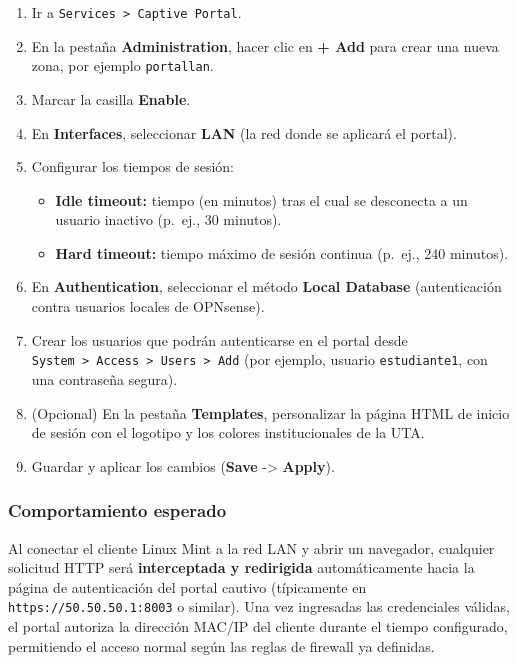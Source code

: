 \documentclass{article}
\providecommand{\tightlist}{%
  \setlength{\itemsep}{0pt}\setlength{\parskip}{0pt}}
\renewcommand{\_}{\oldunderscore\hskip0pt\relax}
\begin{document}
\begin{enumerate}
\def\labelenumi{\arabic{enumi}.}
\tightlist
\item
  Ir a \texttt{Services\ \textgreater{}\ Captive\ Portal}.
\item
  En la pestaña \textbf{Administration}, hacer clic en \textbf{+ Add}
  para crear una nueva zona, por ejemplo \texttt{portal\_lan}.
\item
  Marcar la casilla \textbf{Enable}.
\item
  En \textbf{Interfaces}, seleccionar \textbf{LAN} (la red donde se
  aplicará el portal).
\item
  Configurar los tiempos de sesión:

  \begin{itemize}
  \tightlist
  \item
    \textbf{Idle timeout:} tiempo (en minutos) tras el cual se
    desconecta a un usuario inactivo (p.~ej., 30 minutos).
  \item
    \textbf{Hard timeout:} tiempo máximo de sesión continua (p.~ej., 240
    minutos).
  \end{itemize}
\item
  En \textbf{Authentication}, seleccionar el método \textbf{Local
  Database} (autenticación contra usuarios locales de OPNsense).
\item
  Crear los usuarios que podrán autenticarse en el portal desde
  \texttt{System\ \textgreater{}\ Access\ \textgreater{}\ Users\ \textgreater{}\ Add}
  (por ejemplo, usuario \texttt{estudiante1}, con una contraseña
  segura).
\item
  (Opcional) En la pestaña \textbf{Templates}, personalizar la página
  HTML de inicio de sesión con el logotipo y los colores institucionales
  de la UTA.
\item
  Guardar y aplicar los cambios (\textbf{Save} -\textgreater{}
  \textbf{Apply}).
\end{enumerate}

\hypertarget{comportamiento-esperado}{%
\subsubsection{Comportamiento esperado}\label{comportamiento-esperado}}

Al conectar el cliente Linux Mint a la red LAN y abrir un navegador,
cualquier solicitud HTTP será \textbf{interceptada y redirigida}
automáticamente hacia la página de autenticación del portal cautivo
(típicamente en \texttt{https://50.50.50.1:8003} o similar). Una vez
ingresadas las credenciales válidas, el portal autoriza la dirección
MAC/IP del cliente durante el tiempo configurado, permitiendo el acceso
normal según las reglas de firewall ya definidas.
\end{document}
